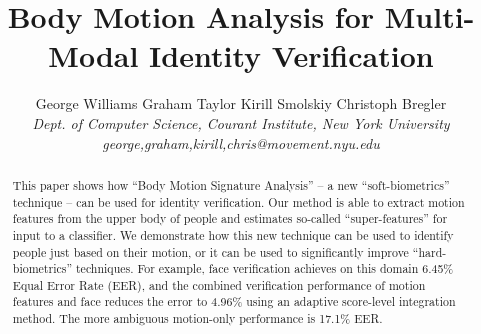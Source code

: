 \documentclass[times, 10pt,twocolumn]{article}
\begin{document}
\title{Body Motion Analysis for Multi-Modal Identity Verification}

\author{George Williams  \hspace{0.1in} Graham Taylor \hspace{0.1in} Kirill Smolskiy \hspace{0.1in} Christoph Bregler \\
\emph{Dept. of Computer Science, Courant Institute, New York University}\\
\emph{george,graham,kirill,chris@movement.nyu.edu}\\
}

\maketitle
\thispagestyle{empty}

\begin{abstract}
This paper shows how ``Body Motion Signature Analysis''  -- a new ``soft-biometrics'' technique --  can be used for identity verification.  Our method is able to extract motion features from the upper body of people and estimates so-called ``super-features'' for input to a classifier.  We demonstrate how this new technique can be used to identify people just based on their motion, or it can be used to significantly improve ``hard-biometrics'' techniques.  For example, face verification achieves on this domain 6.45\% Equal Error Rate (EER), and the combined verification performance of motion features and face reduces the error to 4.96\% using an adaptive score-level integration method.  The more ambiguous motion-only performance is 17.1\% EER.

\end{abstract}
\end{document}
